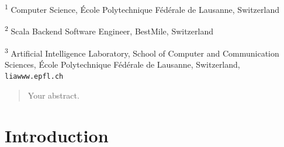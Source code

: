 \documentclass[12pt,a4paper]{article}
\begin{document}
\small \textsuperscript{1} Computer Science,  \'Ecole Polytechnique F\'ed\'erale de Lausanne, Switzerland

\small \textsuperscript{2} Scala Backend Software Engineer, BestMile, Switzerland 

\small \textsuperscript{3} Artificial Intelligence Laboratory, School of Computer and Communication Sciences, \'Ecole Polytechnique F\'ed\'erale de Lausanne, Switzerland, \verb+liawww.epfl.ch+ 




\newpage


\begin{abstract}
Your abstract.
\end{abstract}

\newpage

\tableofcontents
\newpage
\setlength{\parskip}{0.5em}
\section{Introduction}
\end{document}
